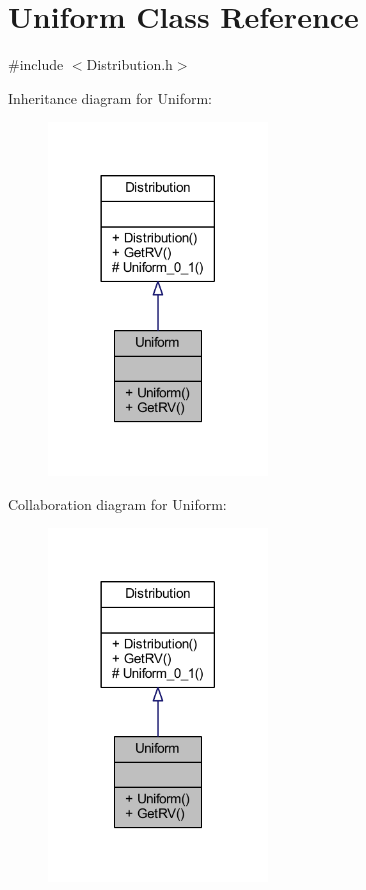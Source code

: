 \hypertarget{class_uniform}{}\section{Uniform Class Reference}
\label{class_uniform}


{\ttfamily \#include $<$Distribution.\+h$>$}



Inheritance diagram for Uniform\+:\nopagebreak
\begin{figure}[H]
\begin{center}
\leavevmode
\includegraphics[width=165pt]{class_uniform__inherit__graph}
\end{center}
\end{figure}


Collaboration diagram for Uniform\+:\nopagebreak
\begin{figure}[H]
\begin{center}
\leavevmode
\includegraphics[width=165pt]{class_uniform__coll__graph}
\end{center}
\end{figure}
